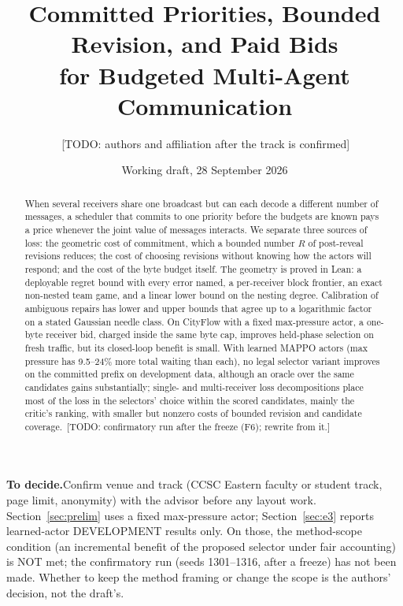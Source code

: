 \documentclass[11pt]{article}
\theoremstyle{definition}
\newif\ifshownotes\shownotestrue
\newcommand{\TODO}[1]{\ifshownotes{\color{todocol}\,\textsf{\footnotesize[TODO: #1]}}\fi}
\newcommand{\TODOPAR}[1]{\ifshownotes\par\vspace{2pt}\noindent%
  {\color{todocol}\textsf{\footnotesize\textbf{To decide.}\;#1}}\par\vspace{2pt}\fi}
\begin{document}
\title{Committed Priorities, Bounded Revision, and Paid Bids\\for Budgeted Multi-Agent Communication}
\author{\TODO{authors and affiliation after the track is confirmed}}
\date{Working draft, 28 September 2026}
\maketitle

\TODOPAR{Confirm venue and track (CCSC Eastern faculty or student track, page limit, anonymity) with
the advisor before any layout work. Section~\ref{sec:prelim} uses a fixed max-pressure actor;
Section~\ref{sec:e3} reports learned-actor DEVELOPMENT results only. On those, the method-scope
condition (an incremental benefit of the proposed selector under fair accounting) is NOT met; the
confirmatory run (seeds 1301--1316, after a freeze) has not been made. Whether to keep the method
framing or change the scope is the authors' decision, not the draft's.}

\begin{abstract}
When several receivers share one broadcast but can each decode a different number of messages,
a scheduler that commits to one priority before the budgets are known pays a price whenever the
joint value of messages interacts. We separate three sources of loss: the geometric cost of
commitment, which a bounded number $R$ of post-reveal revisions reduces; the cost of choosing
revisions without knowing how the actors will respond; and the cost of the byte budget
itself. The geometry is proved in Lean: a deployable regret bound with every error named, a
per-receiver block frontier, an exact non-nested team game, and a linear lower bound on the
nesting degree. Calibration of ambiguous repairs has lower and upper bounds that agree up to a
logarithmic factor on a stated Gaussian needle class. On CityFlow with a fixed max-pressure actor, a one-byte receiver
bid, charged inside the same byte cap, improves held-phase selection on fresh traffic, but its
closed-loop benefit is small. With learned MAPPO actors (max pressure has 9.5--24\% more total waiting than each), no legal
selector variant improves on the committed prefix on development data, although an oracle over the
same candidates gains substantially; single- and multi-receiver loss decompositions place most of the
loss in the selectors' choice within the scored candidates, mainly the critic's ranking, with smaller but
nonzero costs of bounded revision and candidate coverage. \TODO{confirmatory run after the freeze (F6); rewrite from it.}
\end{abstract}
\end{document}
